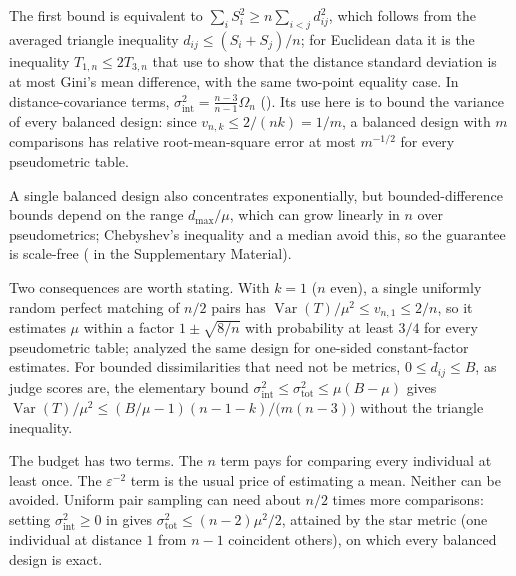 \documentclass[twoside,11pt]{article}
\DeclareMathOperator{\Var}{Var}
\newcommand{\sigmaint}{\sigma^2_{\mathrm{int}}}
\newcommand{\sigmatot}{\sigma^2_{\mathrm{tot}}}
\begin{document}
The first bound is equivalent to $\sum_iS_i^2\ge n\sum_{i<j}d_{ij}^2$, which
follows from the averaged triangle inequality $d_{ij}\le(S_i+S_j)/n$; for
Euclidean data it is the inequality $T_{1,n}\le2T_{3,n}$ that
\citet[Lemma~4.1]{edelmann2020distance} use to show that the distance
standard deviation is at most Gini's mean difference, with the same
two-point equality case. In distance-covariance terms,
$\sigmaint=\frac{n-3}{n-1}\Omega_n$ (). Its use here is
to bound the variance of every balanced design: since $v_{n,k}\le2/(nk)=1/m$,
a balanced design with $m$ comparisons has relative root-mean-square error
at most $m^{-1/2}$ for every pseudometric table.

A single balanced design also concentrates exponentially, but
bounded-difference bounds depend on the range
$d_{\max}/\mu$, which can grow linearly in $n$ over pseudometrics; Chebyshev's
inequality and a median avoid this, so the guarantee is scale-free
( in the Supplementary Material).

Two consequences are worth stating. With $k=1$ ($n$ even), a single
uniformly random perfect matching of $n/2$ pairs has
$\Var(T)/\mu^2\le v_{n,1}\le2/n$, so it estimates $\mu$ within a factor
$1\pm\sqrt{8/n}$ with probability at least $3/4$ for every pseudometric
table; \citet{chang2017metric} analyzed the same design for one-sided
constant-factor estimates. For bounded dissimilarities that need not be
metrics, $0\le d_{ij}\le B$, as judge scores are, the elementary bound
$\sigmaint\le\sigmatot\le\mu(B-\mu)$ gives
$\Var(T)/\mu^2\le(B/\mu-1)(n-1-k)/\bigl(m(n-3)\bigr)$ without the
triangle inequality.


The budget has two terms. The $n$ term pays for comparing every individual
at least once. The $\varepsilon^{-2}$ term is the usual price of estimating
a mean. Neither can be avoided. Uniform pair sampling can need about $n/2$
times more comparisons: setting $\sigmaint\ge0$ in  gives
$\sigmatot\le(n-2)\mu^2/2$, attained by the star metric (one individual at
distance $1$ from $n-1$ coincident others), on which every balanced design is
exact.
\end{document}
